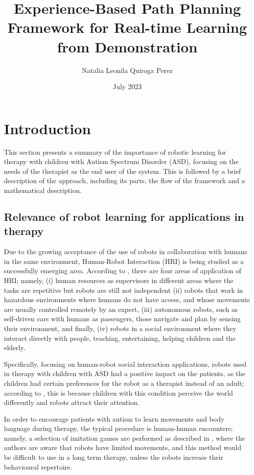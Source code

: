 \documentclass[thesis]{mas_proposal}
\title{Experience-Based Path Planning Framework for Real-time Learning from Demonstration}
\author{Natalia Leonila Quiroga Perez}
\date{July 2023}
\begin{document}
\maketitle

\pagestyle{plain}

\section{Introduction}

	This section presents a summary of the importance of robotic learning for therapy with children with Autism Spectrum Disorder (ASD), focusing on the needs of the therapist as the end user of the system. This is followed by a brief description of the approach, including its parts, the flow of the framework and a mathematical description.

\subsection{Relevance of robot learning for applications in therapy}

    Due to the growing acceptance of the use of robots in collaboration with humans in the same environment, Human-Robot Interaction (HRI) is being studied as a successfully emerging area. According to \cite{Sheridan2016}, there are four areas of application of HRI; namely, (i) human resources as supervisors in different areas where the tasks are repetitive but robots are still not independent (ii) robots that work in hazardous environments where humans do not have access, and whose movements are usually controlled remotely by an expert, (iii) autonomous robots, such as self-driven cars with humans as passengers, those navigate and plan by sensing their environment, and finally, (iv) robots in a social environment where they interact directly with people, teaching, entertaining, helping children and the elderly.
    
    Specifically, focusing on human-robot social interaction applications, robots used in therapy with children with ASD had a positive impact on the patients, as the children had certain preferences for the robot as a therapist instead of an adult; according to \cite{Prabha2019}, this is because children with this condition perceive the world differently and robots attract their attention.
    
    In order to encourage patients with autism to learn movements and body language during therapy, the typical procedure is human-human encounters; namely, a selection of imitation games are performed as described in \cite{Dautenhahn2004}, where the authors are aware that robots have limited movements, and this method would be difficult to use in a long term therapy, unless the robots increase their behavioural repertoire.
    
\end{document}
